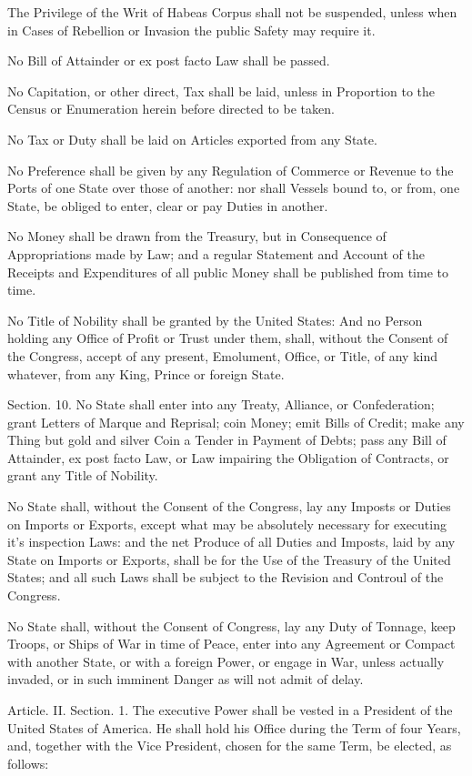\documentclass{article}
\begin{document}
The Privilege of the Writ of Habeas Corpus shall not be suspended,
unless when in Cases of Rebellion or Invasion the public Safety may
require it.

No Bill of Attainder or ex post facto Law shall be passed.

No Capitation, or other direct, Tax shall be laid, unless in Proportion
to the Census or Enumeration herein before directed to be taken.

No Tax or Duty shall be laid on Articles exported from any State.

No Preference shall be given by any Regulation of Commerce or Revenue to
the Ports of one State over those of another: nor shall Vessels bound
to, or from, one State, be obliged to enter, clear or pay Duties in
another.

No Money shall be drawn from the Treasury, but in Consequence of
Appropriations made by Law; and a regular Statement and Account of the
Receipts and Expenditures of all public Money shall be published from
time to time.

No Title of Nobility shall be granted by the United States: And no
Person holding any Office of Profit or Trust under them, shall, without
the Consent of the Congress, accept of any present, Emolument, Office,
or Title, of any kind whatever, from any King, Prince or foreign State.

Section. 10.  No State shall enter into any Treaty, Alliance, or
Confederation; grant Letters of Marque and Reprisal; coin Money; emit
Bills of Credit; make any Thing but gold and silver Coin a Tender in
Payment of Debts; pass any Bill of Attainder, ex post facto Law, or Law
impairing the Obligation of Contracts, or grant any Title of Nobility.

No State shall, without the Consent of the Congress, lay any Imposts or
Duties on Imports or Exports, except what may be absolutely necessary
for executing it's inspection Laws: and the net Produce of all Duties
and Imposts, laid by any State on Imports or Exports, shall be for the
Use of the Treasury of the United States; and all such Laws shall be
subject to the Revision and Controul of the Congress.

No State shall, without the Consent of Congress, lay any Duty of
Tonnage, keep Troops, or Ships of War in time of Peace, enter into any
Agreement or Compact with another State, or with a foreign Power, or
engage in War, unless actually invaded, or in such imminent Danger as
will not admit of delay.

Article. II.  Section. 1.  The executive Power shall be vested in a
President of the United States of America. He shall hold his Office
during the Term of four Years, and, together with the Vice President,
chosen for the same Term, be elected, as follows:
\end{document}
